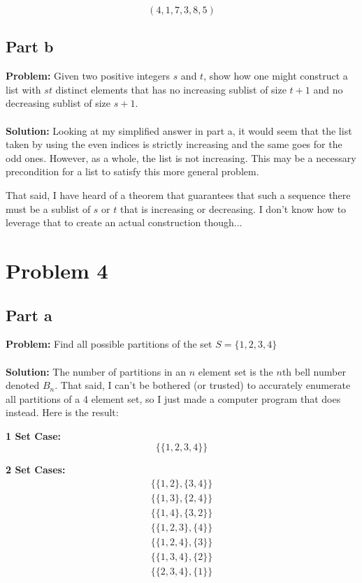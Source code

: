 \documentclass{article}
\begin{document}
$$(4,1,7,3,8,5)$$

\subsection{Part b}
\textbf{Problem:} Given two positive integers $s$ and $t$, show how one might construct a list with $st$ distinct elements that has no increasing sublist of size $t+1$ and no decreasing sublist of size $s+1$.
\\\\
\textbf{Solution:} Looking at my simplified answer in part a, it would seem that the list taken by using the even indices is strictly increasing and the same goes for the odd ones. However, as a whole, the list is not increasing. This may be a necessary precondition for a list to satisfy this more general problem.

That said, I have heard of a theorem that guarantees that such a sequence there must be a sublist of $s$ or $t$ that is increasing or decreasing. I don't know how to leverage that to create an actual construction though...

\section{Problem 4}
\subsection{Part a}
\textbf{Problem:} Find all possible partitions of the set $S=\{1,2,3,4\}$
\\\\
\textbf{Solution:} The number of partitions in an $n$ element set is the $n$th bell number denoted $B_n$. That said, I can't be bothered (or trusted) to accurately enumerate all partitions of a 4 element set, so I just made a computer program that does instead. Here is the result: \newline

\textbf{1 Set Case:}
$$\{\{1,2,3,4\}\}$$

\textbf{2 Set Cases:}
\begin{gather*}
\{\{1,2\},\{3,4\}\}\\
\{\{1,3\},\{2,4\}\}\\
\{\{1,4\},\{3,2\}\}\\
\{\{1,2,3\},\{4\}\}\\
\{\{1,2,4\},\{3\}\}\\
\{\{1,3,4\},\{2\}\}\\
\{\{2,3,4\},\{1\}\}
\end{gather*}
\end{document}
